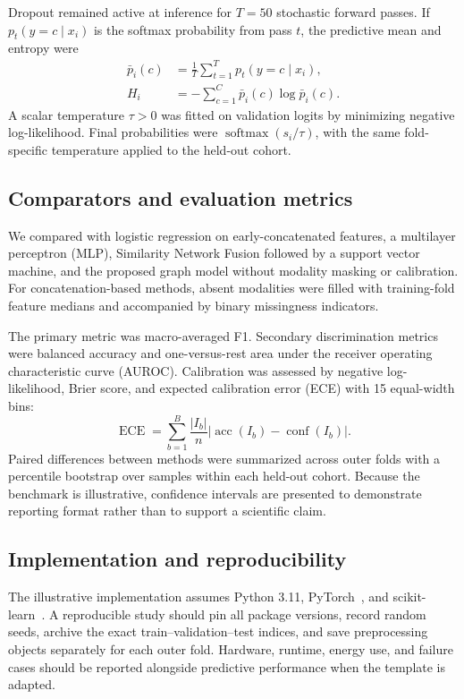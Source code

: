 Dropout remained active at inference for $T=50$ stochastic forward passes. If
$p_t(y=c\mid x_i)$ is the softmax probability from pass $t$, the predictive mean
and entropy were
\begin{align}
\bar p_i(c) &= \frac{1}{T}\sum_{t=1}^{T}p_t(y=c\mid x_i),\\
H_i &= -\sum_{c=1}^{C}\bar p_i(c)\log \bar p_i(c).
\label{eq:entropy}
\end{align}
A scalar temperature $\tau>0$ was fitted on validation logits by minimizing
negative log-likelihood. Final probabilities were
$\operatorname{softmax}(s_i/\tau)$, with the same fold-specific temperature
applied to the held-out cohort.

\subsection{Comparators and evaluation metrics}

We compared \modelname{} with logistic regression on early-concatenated features,
a multilayer perceptron (MLP), Similarity Network Fusion followed by a support
vector machine, and the proposed graph model without modality masking or
calibration. For concatenation-based methods, absent modalities were filled with
training-fold feature medians and accompanied by binary missingness indicators.

The primary metric was macro-averaged F1. Secondary discrimination metrics were
balanced accuracy and one-versus-rest area under the receiver operating
characteristic curve (AUROC). Calibration was assessed by negative log-likelihood,
Brier score, and expected calibration error (ECE) with 15 equal-width bins:
\begin{equation}
\operatorname{ECE}=\sum_{b=1}^{B}\frac{|I_b|}{n}
\left|\operatorname{acc}(I_b)-\operatorname{conf}(I_b)\right|.
\label{eq:ece}
\end{equation}
Paired differences between methods were summarized across outer folds with a
percentile bootstrap over samples within each held-out cohort. Because the
benchmark is illustrative, confidence intervals are presented to demonstrate
reporting format rather than to support a scientific claim.

\subsection{Implementation and reproducibility}

The illustrative implementation assumes Python 3.11, PyTorch~\cite{paszke2019pytorch},
and scikit-learn~\cite{pedregosa2011scikit}. A reproducible study should pin all
package versions, record random seeds, archive the exact train--validation--test
indices, and save preprocessing objects separately for each outer fold. Hardware,
runtime, energy use, and failure cases should be reported alongside predictive
performance when the template is adapted.
